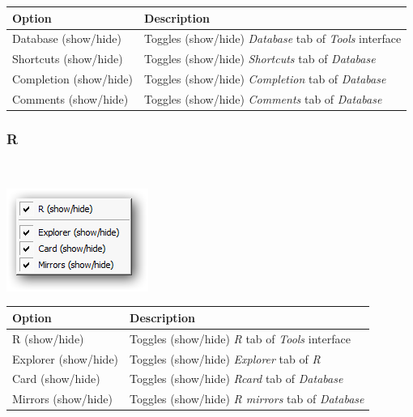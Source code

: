 \begin{scriptsize}\begin{tabularx}{\textwidth}{>{\hsize=0.3\hsize}X>{\hsize=0.7\hsize}X}\\
    \hline
    \textbf{Option} & \textbf{Description} \\
    \hline
    Database (show/hide) & Toggles (show/hide) \textit{Database} tab of \textit{Tools} interface \\
    Shortcuts (show/hide) & Toggles (show/hide) \textit{Shortcuts} tab of \textit{Database} \\
    Completion (show/hide) & Toggles (show/hide) \textit{Completion} tab of \textit{Database} \\
    Comments (show/hide) & Toggles (show/hide) \textit{Comments} tab of \textit{Database} \\
    \hline
  \end{tabularx}\end{scriptsize}


\hypertarget{menu_view_tools_resources_r}{}
\subsubsection{R}\\

\includegraphics[scale=0.50]{./res/menu_view_tools_resources_r.png}\\

\begin{scriptsize}\begin{tabularx}{\textwidth}{>{\hsize=0.3\hsize}X>{\hsize=0.7\hsize}X}\\
    \hline
    \textbf{Option} & \textbf{Description} \\
    \hline
    R (show/hide) & Toggles (show/hide) \textit{R} tab of \textit{Tools} interface \\
    Explorer (show/hide) & Toggles (show/hide) \textit{Explorer} tab of \textit{R} \\
    Card (show/hide) & Toggles (show/hide) \textit{Rcard} tab of \textit{Database} \\
    Mirrors (show/hide) & Toggles (show/hide) \textit{R mirrors} tab of \textit{Database} \\
    \hline
  \end{tabularx}\end{scriptsize}



